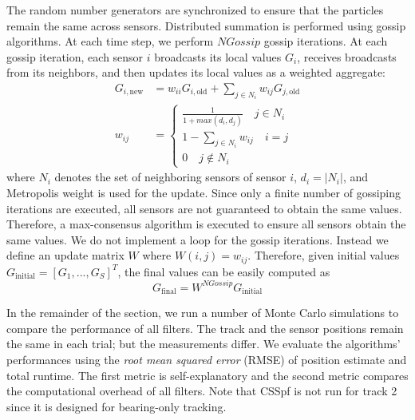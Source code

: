 \documentclass[10pt,letterpaper,final]{article}
\begin{document}
The random number generators are synchronized to ensure that the particles remain the same across sensors. Distributed summation is performed using gossip algorithms. At each time step, we perform $NGossip$ gossip iterations. At each gossip iteration, each sensor $i$ broadcasts its local values $G_i$, receives broadcasts from its neighbors, and then updates its local values as a weighted aggregate:
\begin{align}
G_{i,\text{new}} &= w_{ii}G_{i,\text{old}} + \sum_{j\in N_i}w_{ij}G_{j,\text{old}} \\
w_{ij} &=
\begin{cases}
\frac{1}{1+max(d_i, d_j)} \quad j\in N_i \\
1-\sum_{j\in N_i}w_{ij} \quad i=j \\
0 \quad j\notin N_i
\end{cases}
\label{eqn:metropolis_weight}
\end{align}
where $N_i$ denotes the set of neighboring sensors of sensor $i$, $d_i=|N_i|$, and Metropolis weight is used for the update. Since only a finite number of gossiping iterations are executed, all sensors are not guaranteed to obtain the same values. Therefore, a max-consensus algorithm is executed to ensure all sensors obtain the same values. We do not implement a loop for the gossip iterations. Instead we define an update matrix $W$ where $W(i,j)=w_{ij}$. Therefore, given initial values $G_{\text{initial}}=[G_1,...,G_S]^T$, the final values can be easily computed as 
\begin{equation}
G_{\text{final}} = W^{NGossip}G_{\text{initial}}
\end{equation}

In the remainder of the section, we run a number of Monte Carlo simulations to compare the performance of all filters. The track and the sensor positions remain the same in each trial; but the measurements differ. We evaluate the algorithms' performances using the \textit{root mean squared error} (RMSE) of position estimate and total runtime. The first metric is self-explanatory and the second metric compares the computational overhead of all filters. Note that CSSpf is not run for track 2 since it is designed for bearing-only tracking. 
\end{document}
